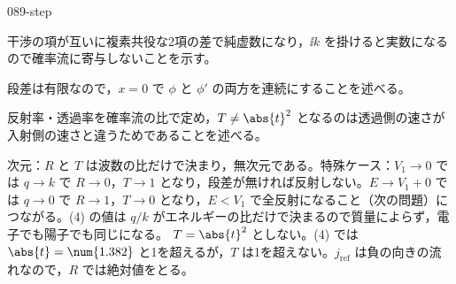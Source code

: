 \documentclass[uplatex,dvipdfmx,a4paper,11pt]{jsarticle}
\begin{document}
\begin{kaisetsu}{089-step}
\begin{ronten}
  \item {} 干渉の項が互いに複素共役な2項の差で純虚数になり，$\ii k$ を掛けると実数になるので確率流に寄与しないことを示す。
  \item {} 段差は有限なので，$x=0$ で $\phi$ と $\phi'$ の両方を連続にすることを述べる。
  \item {} 反射率・透過率を確率流の比で定め，$T\ne\abs{t}^{2}$ となるのは透過側の速さが入射側の速さと違うためであることを述べる。
\end{ronten}
\kenzan 次元：$R$ と $T$ は波数の比だけで決まり，無次元である。特殊ケース：$V_{1}\to 0$ では $q\to k$ で $R\to 0$，$T\to 1$ となり，段差が無ければ反射しない。$E\to V_{1}+0$ では $q\to 0$ で $R\to 1$，$T\to 0$ となり，$E<V_{1}$ で全反射になること（次の問題）につながる。(4) の値は $q/k$ がエネルギーの比だけで決まるので質量によらず，電子でも陽子でも同じになる。
\tsumazuki $T=\abs{t}^{2}$ としない。(4) では $\abs{t}=\num{1.382}$ と1を超えるが，$T$ は1を超えない。$j_{\mathrm{ref}}$ は負の向きの流れなので，$R$ では絶対値をとる。
\end{kaisetsu}
\end{document}
